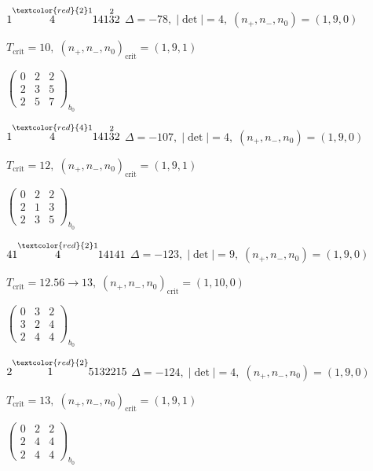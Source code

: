 \documentclass[10pt]{article}
\begin{document}
\smallskip

$1\overset{\textcolor{red}{2}1}{4}141\overset{2}{3}2$ \quad $\Delta=-78,\; |\det|=4,\; (n_+,n_-,n_0)=(1,9,0)$

\hspace{1em}$T_{\text{crit}}=10,\; (n_+,n_-,n_0)_{\text{crit}}=(1,9,1)$

\hspace{2em}$\left(\begin{smallmatrix}0 & 2 & 2 \\ 2 & 3 & 5 \\ 2 & 5 & 7\end{smallmatrix}\right)_{\!b_0}$

$1\overset{\textcolor{red}{4}1}{4}141\overset{2}{3}2$ \quad $\Delta=-107,\; |\det|=4,\; (n_+,n_-,n_0)=(1,9,0)$

\hspace{1em}$T_{\text{crit}}=12,\; (n_+,n_-,n_0)_{\text{crit}}=(1,9,1)$

\hspace{2em}$\left(\begin{smallmatrix}0 & 2 & 2 \\ 2 & 1 & 3 \\ 2 & 3 & 5\end{smallmatrix}\right)_{\!b_0}$

\smallskip

$41\overset{\textcolor{red}{2}1}{4}14141$ \quad $\Delta=-123,\; |\det|=9,\; (n_+,n_-,n_0)=(1,9,0)$

\hspace{1em}$T_{\text{crit}}=12.56 \to 13,\; (n_+,n_-,n_0)_{\text{crit}}=(1,10,0)$

\hspace{2em}$\left(\begin{smallmatrix}0 & 3 & 2 \\ 3 & 2 & 4 \\ 2 & 4 & 4\end{smallmatrix}\right)_{\!b_0}$

\smallskip

$2\overset{\textcolor{red}{2}}{1}5132215$ \quad $\Delta=-124,\; |\det|=4,\; (n_+,n_-,n_0)=(1,9,0)$

\hspace{1em}$T_{\text{crit}}=13,\; (n_+,n_-,n_0)_{\text{crit}}=(1,9,1)$

\hspace{2em}$\left(\begin{smallmatrix}0 & 2 & 2 \\ 2 & 4 & 4 \\ 2 & 4 & 4\end{smallmatrix}\right)_{\!b_0}$
\end{document}
